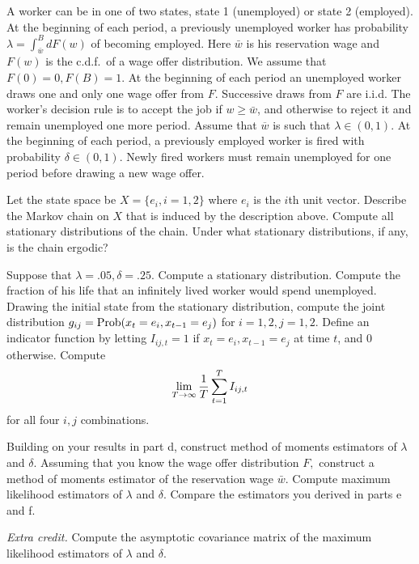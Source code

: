 \medskip
{} %
\medskip
\noindent
A worker can be in one of two states, state 1 (unemployed) or state
2 (employed).
At the beginning of each period,
a previously  unemployed worker has probability $\lambda = \int_{\bar w}^B d F(w)$
of  becoming employed.  Here $\bar w$ is his reservation wage
and $F(w)$ is the c.d.f.\ of     a wage offer distribution. We assume
that $F(0)=0, F(B)=1$. At the
beginning of each period an unemployed worker draws one and only one wage
offer from $F$. Successive draws from $F$ are i.i.d.
The worker's decision rule is to accept the job if $w \geq \bar w$,
and otherwise to reject it   and remain unemployed one more period.
Assume that $\overline w$ is such that $\lambda \in (0,1)$.
At the beginning of each period, a previously employed worker is fired
with probability $\delta \in (0,1)$. Newly fired workers must remain unemployed
for one period before drawing a new wage offer.

\medskip
{}  Let the state space be $X = \{e_i, i=1,2\}$ where
$e_i$ is the $i$th unit vector. Describe the Markov chain on $X$
that is induced by the description above.
Compute all stationary distributions of the chain.
Under what stationary distributions, if any, is the chain ergodic?

\medskip
{}   Suppose that $\lambda = .05, \delta  =.25$.  Compute
a stationary  distribution.  Compute the fraction of his life that
an infinitely lived worker would spend
unemployed.
\medskip
{}   Drawing the initial state from the
stationary distribution, compute the joint distribution
$ g_{ij} = {\rm Prob}(x_t = e_i, x_{t-1} =e_j) $ for $i=1,2, j=1,2$.
\medskip
{}  Define an indicator function by  letting
$I_{ij, t} = 1$ if $x_t = e_i, x_{t-1} = e_j$
at time $t$, and $0$ otherwise.
Compute
$$ \lim_{T \rightarrow \infty} {1 \over T} \sum_{t=1}^T I_{ij,t}$$
for all four $i,j$ combinations.

\medskip
{}  Building on your results in  part d, construct
method of moments estimators of
$\lambda$  and $\delta$.
Assuming that you know the wage offer distribution $F,$
construct a method of moments estimator of  the reservation wage
$\bar w$.
\medskip
{}  Compute maximum likelihood estimators of
$\lambda$ and $\delta$.
\medskip
{}  Compare   the estimators you derived in
parts e and f.

\medskip
{} {\it Extra credit.}  Compute the asymptotic covariance
matrix of the maximum likelihood estimators of $\lambda$ and $\delta$.
\medskip


